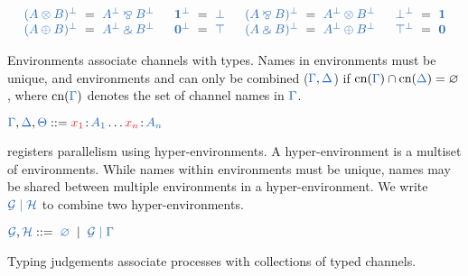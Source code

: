 \documentclass[envcountsame,UKenglish]{llncs}
\begin{document}
\begin{definition}[Duality]\label{def:cp-negation}
  \[
    \setlength{\arraycolsep}{3pt}
    \begin{array}{lclclcllclclcl}
              \ty{(A \tens B)^\bot} &=& \ty{A^\bot \parr B^\bot}
      &\quad \ty{\one^\bot}        &=& \ty{\bot}
      &\quad \ty{(A \parr B)^\bot} &=& \ty{A^\bot \tens B^\bot}
      &\quad \ty{\bot^\bot}        &=& \ty{\one}
      \\      \ty{(A \plus B)^\bot} &=& \ty{A^\bot \with B^\bot}
      &\quad \ty{\nil^\bot}        &=& \ty{\top}
      &\quad \ty{(A \with B)^\bot} &=& \ty{A^\bot \plus B^\bot}
      &\quad \ty{\top^\bot}        &=& \ty{\nil}
    \end{array}
  \]
\end{definition}
Environments associate channels with types. Names in environments must be unique, and environments \ty{\Gamma} and \ty{\Delta} can only be combined ($\ty{\Gamma}, \ty{\Delta}$) if $\text{cn}(\ty{\Gamma}) \cap \text{cn}(\ty{\Delta}) = \varnothing$, where $\text{cn}{(\ty{\Gamma})}$ denotes the set of channel names in $\ty{\Gamma}$. 
\begin{definition}[Environments]\label{def:cp-environments}
  $\ty{\Gamma}, \ty{\Delta}, \ty{\Theta} ::= \tmty{x_1}{A_1}\dots\tmty{x_n}{A_n}$
\end{definition}
\hcp registers parallelism using hyper-environments. A hyper-environment is a multiset of environments. While names within environments must be unique, names may be shared between multiple environments in a hyper-environment. We write $\ty{\mathcal{G} \hsep \mathcal{H}}$ to combine two hyper-environments.
\begin{definition}\label{def:hcp-hyper-environment}
  $\ty{\mathcal{G}}, \ty{\mathcal{H}} ::= \; \ty{\emptyhypercontext} \; \mid \; \ty{\mathcal{G} \hsep \Gamma}$
\end{definition}
Typing judgements associate processes with collections of typed channels.
\end{document}
